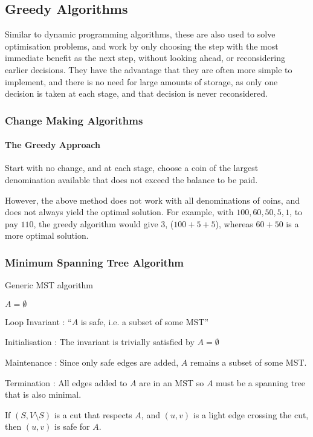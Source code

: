 \documentclass[10pt]{article}
\begin{document}
\subsection{Greedy Algorithms}
Similar to dynamic programming algorithms, these are also used to solve optimisation problems, and work by only choosing the step with the most immediate benefit as the next step, without looking ahead, or reconsidering earlier decisions.  They have the advantage that they are often more simple to implement, and there is no need for large amounts of storage, as only one decision is taken at each stage, and that decision is never reconsidered.
\subsubsection{Change Making Algorithms}
\paragraph{The Greedy Approach}Start with no change, and at each stage, choose a coin of the largest denomination available that does not exceed the balance to be paid.

However, the above method does not work with all denominations of coins, and does not always yield the optimal solution.  For example, with $100,60,50,5,1$, to pay $110$, the greedy algorithm would give 3, ($100+5+5$), whereas $60+50$ is a more optimal solution.
\subsubsection{Minimum Spanning Tree Algorithm}
\begin{algorithm}
	\caption{Generic MST algorithm}
	$A=\emptyset$\;
\end{algorithm}
\begin{description*}
	\item[Loop Invariant]: ``$A$ is safe, i.e. a subset of some MST''
	\item[Initialisation]: The invariant is trivially satisfied by $A=\emptyset$
	\item[Maintenance]: Since only safe edges are added, $A$ remains a subset of some MST.
	\item[Termination]: All edges added to $A$ are in an MST so $A$ must be a spanning tree that is also minimal.
\end{description*}
If $(S,V\setminus S)$ is a cut that respects $A$, and $(u,v)$ is a light edge crossing the cut, then $(u,v)$ is safe for $A$.
\end{document}
